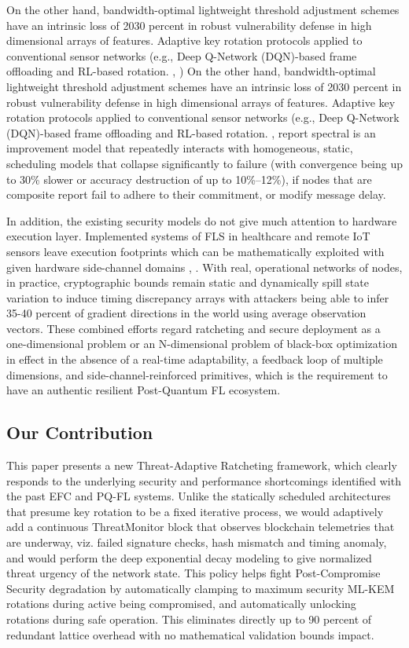 \documentclass[journal, 10pt, twocolumn]{IEEEtran}
\begin{document}
On the other hand, bandwidth-optimal lightweight threshold adjustment schemes have an intrinsic loss of 2030 percent in robust vulnerability defense in high dimensional arrays of features. Adaptive key rotation protocols applied to conventional sensor networks (e.g., Deep Q-Network (DQN)-based frame offloading and RL-based rotation. \cite{kappala2026}, \cite{nguyen2025}) On the other hand, bandwidth-optimal lightweight threshold adjustment schemes have an intrinsic loss of 2030 percent in robust vulnerability defense in high dimensional arrays of features. Adaptive key rotation protocols applied to conventional sensor networks (e.g., Deep Q-Network (DQN)-based frame offloading and RL-based rotation. \cite{sharma2022}, \cite{eren2025} report spectral is an improvement model that repeatedly interacts with homogeneous, static, scheduling models that collapse significantly to failure (with convergence being up to 30\% slower or accuracy destruction of up to 10\%--12\%), if nodes that are composite report fail to adhere to their commitment, or modify message delay.
 


In addition, the existing security models do not give much attention to hardware execution layer. Implemented systems of FLS in healthcare and remote IoT sensors leave execution footprints which can be mathematically exploited with given hardware side-channel domains \cite{wang2026}, \cite{saeed2024}. With real, operational networks of nodes, in practice, cryptographic bounds remain static and dynamically spill state variation to induce timing discrepancy arrays with attackers being able to infer 35-40 percent of gradient directions in the world using average observation vectors. These combined efforts regard ratcheting and secure deployment as a one-dimensional problem or an N-dimensional problem of black-box optimization in effect in the absence of a real-time adaptability, a feedback loop of multiple dimensions, and side-channel-reinforced primitives, which is the requirement to have an authentic resilient Post-Quantum FL ecosystem.

\subsection{Our Contribution}
This paper presents a new Threat-Adaptive Ratcheting framework, which clearly responds to the underlying security and performance shortcomings identified with the past EFC and PQ-FL systems. Unlike the statically scheduled architectures that presume key rotation to be a fixed iterative process, we would adaptively add a continuous ThreatMonitor block that observes blockchain telemetries that are underway, viz. failed signature checks, hash mismatch and timing anomaly, and would perform the deep exponential decay modeling to give normalized threat urgency of the network state. This policy helps fight Post-Compromise Security degradation by automatically clamping to maximum security ML-KEM rotations during active being compromised, and automatically unlocking rotations during safe operation. This eliminates directly up to 90 percent of redundant lattice overhead with no mathematical validation bounds impact.
\end{document}
